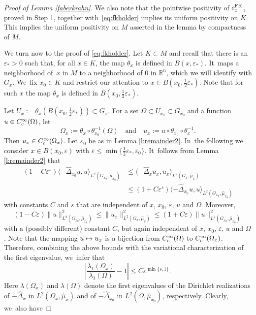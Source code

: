 \documentclass[JEP,XML,SOM,Unicode,published]{cedram}
\newcommand\mto{\mathchoice{\longmapsto}{\mapsto}{\mapsto}{\mapsto}}
\newcommand{\rc}{\textup{c}}
\newcommand{\FK}{\textup{FK}}
\theoremstyle{definition}
\let\epsilon\varepsilon
\newcommand{\1}{\mathbbm{1}}
\newcommand{\R}{\mathbb{R}}
\begin{document}
\begin{proof}[Proof of Lemma \ref{faberkrahn}]
We also note that the pointwise positivity of $c^\FK_x$, proved in Step 1, together with~\eqref{eq:fkholder} implies its uniform positivity on $K$. This implies the uniform positivity on $M$ asserted in the lemma by compactness of $M$.

We turn now to the proof of \eqref{eq:fkholder}. Let $K\subset M$ and recall that there is an $\epsilon_*>0$ such that, for all $x\in K$, the map $\theta_x$ is defined in $B(x,\epsilon_*)$. It~maps a neighborhood of~$x$ in $M$ to a neighborhood of $0$ in $\R^n$, which we will identify with $G_x$. We~fix $x_0\in K$ and restrict our attention to $x\in B(x_0,\frac12\epsilon_*)$. Note that for such $x$ the map $\theta_x$ is defined in $B(x_0,\frac12\epsilon_*)$.

Let $U_x :=\theta_{x}(B(x_0,\frac12\epsilon_*))\subset G_x$. For a set $\Omega\subset U_{x_0}\subset G_{x_0}$ and a function $u\in C^\infty_\rc(\Omega)$, let
\[
\Omega_x:= \theta_x\circ \theta_{x_0}^{-1}(\Omega)
\quad\text{and}\quad
u_x := u \circ \theta_{x_0} \circ \theta_x^{-1}.
\]
Then $u_x\in C^\infty_\rc(\Omega_x)$. Let $\epsilon_0$ be as in Lemma \ref{l:remainder2}. In~the following we consider $x\in B(x_0,\epsilon)$ with $\epsilon\leq\min\{\frac12\epsilon_*,\epsilon_0\}$. It~follows from Lemma \ref{l:remainder2} that
\begin{align*}
(1-C \epsilon^s) \langle -\widehat\Delta_{x_0} u, u \rangle_{L^2(G_{x_0},\widehat\mu_{x_0})} & \leq
\langle -\widehat\Delta_{x} u_x, u_x \rangle_{L^2(G_{x},\widehat\mu_{x})} \\
& \leq (1+C \epsilon^s) \langle -\widehat\Delta_{x_0} u, u \rangle_{L^2(G_{x_0},\widehat\mu_{x_0})}
\end{align*}
with constants $C$ and $s$ that are independent of $x$, $x_0$, $\epsilon$, $u$ and $\Omega$. Moreover,
\[
(1-C \epsilon) \| u \|_{L^2(G_{x_0},\widehat\mu_{x_0})}^2 \leq
\| u_x \|_{L^2(G_{x},\widehat\mu_{x})}^2
\leq (1+C \epsilon) \| u \|_{L^2(G_{x_0},\widehat\mu_{x_0})}^2
\]
with a (possibly different) constant $C$, but again independent of $x$, $x_0$, $\epsilon$, $u$ and $\Omega$. Note that the mapping $u\mto u_x$ is a bijection from $C^\infty_\rc(\Omega)$ to $C^\infty_\rc(\Omega_x)$. Therefore, combining the above bounds with the variational characterization of the first eigenvalue, we~infer that
\begin{equation}
\label{eq:fkcontproof1}
\left| \frac{\lambda_1(\Omega_x)}{\lambda_1(\Omega)} - 1\right| \leq C \epsilon^{\min\{s,1\}}.
\end{equation}
Here $\lambda(\Omega_x)$ and $\lambda(\Omega)$ denote the first eigenvalues of the Dirichlet realizations of $-\widehat\Delta_x$ in $L^2(\Omega_x,\widehat\mu_x)$ and of $-\widehat\Delta_{x_0}$ in $L^2(\Omega,\widehat\mu_{x_0})$, respectively. Clearly, we~also have

\end{proof}
\end{document}

